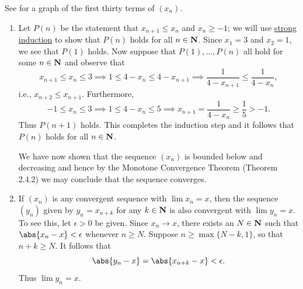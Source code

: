 \documentclass{lew98_solutions}
\begin{document}
\begin{solution}
    See  for a graph of the first thirty terms of \( (x_n) \).
    \begin{enumerate}
        \item Let \( P(n) \) be the statement that \( x_{n+1} \leq x_n \) and \( x_n \geq -1 \); we will use \href{https://en.wikipedia.org/wiki/Mathematical_induction#Complete_(strong)_induction}{strong induction} to show that \( P(n) \) holds for all \( n \in \mathbf{N} \). Since \( x_1 = 3 \) and \( x_2 = 1 \), we see that \( P(1) \) holds. Now suppose that \( P(1), \ldots, P(n) \) all hold for some \( n \in \mathbf{N} \) and observe that
        \[
            x_{n+1} \leq x_n \leq 3 \implies 1 \leq 4 - x_n \leq 4 - x_{n+1} \implies \frac{1}{4 - x_{n+1}} \leq \frac{1}{4 - x_n},
        \]
        i.e., \( x_{n+2} \leq x_{n+1} \). Furthermore,
        \[
            -1 \leq x_n \leq 3 \implies 1 \leq 4 - x_n \leq 5 \implies x_{n+1} = \frac{1}{4 - x_n} \geq \frac{1}{5} > -1.
        \]
        Thus \( P(n + 1) \) holds. This completes the induction step and it follows that \( P(n) \) holds for all \( n \in \mathbf{N} \).
        
        We have now shown that the sequence \( (x_n) \) is bounded below and decreasing and hence by the Monotone Convergence Theorem (Theorem 2.4.2) we may conclude that the sequence converges.

        \item If \( (x_n) \) is any convergent sequence with \( \lim x_n = x \), then the sequence \( (y_n) \) given by \( y_n = x_{n + k} \) for any \( k \in \mathbf{N} \) is also convergent with \( \lim y_n = x \). To see this, let \( \epsilon > 0 \) be given. Since \( x_n \to x \), there exists an \( N \in \mathbf{N} \) such that \( \abs{x_n - x} < \epsilon \) whenever \( n \geq N \). Suppose \( n \geq \max \{ N - k, 1 \} \), so that \( n + k \geq N \). It follows that
        \[
            \abs{y_n - x} = \abs{x_{n + k} - x} < \epsilon.
        \]
        Thus \( \lim y_n = x \).


\end{enumerate}
\end{solution}
\end{document}
